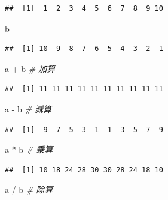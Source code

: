 \documentclass[
  12pt,
]{book}
\newenvironment{Shaded}{\begin{snugshade}}{\end{snugshade}}
\newcommand{\CommentTok}[1]{\textcolor[rgb]{0.56,0.35,0.01}{\textit{#1}}}
\newcommand{\NormalTok}[1]{#1}
\newcommand{\SpecialCharTok}[1]{\textcolor[rgb]{0.00,0.00,0.00}{#1}}
\begin{document}
\begin{verbatim}
##  [1]  1  2  3  4  5  6  7  8  9 10
\end{verbatim}

\begin{Shaded}
\begin{Highlighting}[numbers=left,,]
\NormalTok{b}
\end{Highlighting}
\end{Shaded}

\begin{verbatim}
##  [1] 10  9  8  7  6  5  4  3  2  1
\end{verbatim}

\begin{Shaded}
\begin{Highlighting}[numbers=left,,]
\NormalTok{a }\SpecialCharTok{+}\NormalTok{ b         }\CommentTok{\# 加算}
\end{Highlighting}
\end{Shaded}

\begin{verbatim}
##  [1] 11 11 11 11 11 11 11 11 11 11
\end{verbatim}

\begin{Shaded}
\begin{Highlighting}[numbers=left,,]
\NormalTok{a }\SpecialCharTok{{-}}\NormalTok{ b         }\CommentTok{\# 減算}
\end{Highlighting}
\end{Shaded}

\begin{verbatim}
##  [1] -9 -7 -5 -3 -1  1  3  5  7  9
\end{verbatim}

\begin{Shaded}
\begin{Highlighting}[numbers=left,,]
\NormalTok{a }\SpecialCharTok{*}\NormalTok{ b         }\CommentTok{\# 乗算}
\end{Highlighting}
\end{Shaded}

\begin{verbatim}
##  [1] 10 18 24 28 30 30 28 24 18 10
\end{verbatim}

\begin{Shaded}
\begin{Highlighting}[numbers=left,,]
\NormalTok{a }\SpecialCharTok{/}\NormalTok{ b         }\CommentTok{\# 除算}
\end{Highlighting}
\end{Shaded}
\end{document}
